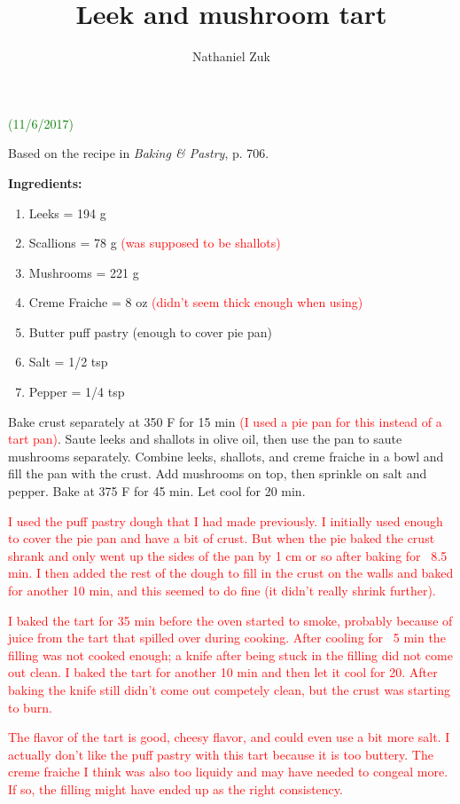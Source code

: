 \usepackage{parskip}
\usepackage{color}

\title{Leek and mushroom tart}
\author{Nathaniel Zuk}


\maketitle

\textcolor{green}{(11/6/2017)}

Based on the recipe in \textit{Baking \& Pastry}, p. 706.

\textbf{Ingredients:}

\begin{enumerate}
\item Leeks = 194 g
\item Scallions = 78 g \textcolor{red}{(was supposed to be shallots)}
\item Mushrooms = 221 g
\item Creme Fraiche = 8 oz \textcolor{red}{(didn't seem thick enough when using)}
\item Butter puff pastry (enough to cover pie pan)
\item Salt = 1/2 tsp
\item Pepper = 1/4 tsp
\end{enumerate}

Bake crust separately at 350 F for 15 min \textcolor{red}{(I used a pie pan for this instead of a tart pan)}.  Saute leeks and shallots in olive oil, then use the pan to saute mushrooms separately.  Combine leeks, shallots, and creme fraiche in a bowl and fill the pan with the crust.  Add mushrooms on top, then sprinkle on salt and pepper.  Bake at 375 F for 45 min.  Let cool for 20 min.

\textcolor{red}{I used the puff pastry dough that I had made previously.  I initially used enough to cover the pie pan and have a bit of crust. But when the pie baked the crust shrank and only went up the sides of the pan by 1 cm or so after baking for ~8.5 min. I then added the rest of the dough to fill in the crust on the walls and baked for another 10 min, and this seemed to do fine (it didn't really shrink further).}

\textcolor{red}{I baked the tart for 35 min before the oven started to smoke, probably because of juice from the tart that spilled over during cooking. After cooling for ~5 min the filling was not cooked enough; a knife after being stuck in the filling did not come out clean. I baked the tart for another 10 min and then let it cool for 20.  After baking the knife still didn't come out competely clean, but the crust was starting to burn.}

\textcolor{red}{The flavor of the tart is good, cheesy flavor, and could even use a bit more salt.  I actually don't like the puff pastry with this tart because it is too buttery. The creme fraiche I think was also too liquidy and may have needed to congeal more. If so, the filling might have ended up as the right consistency.}

